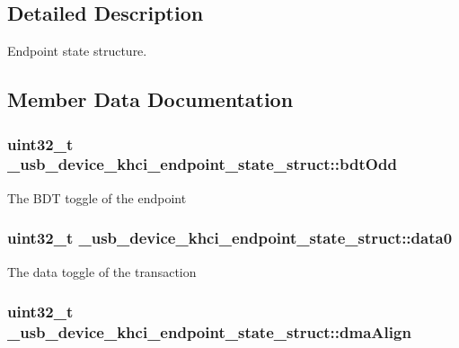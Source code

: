 \subsection{Detailed Description}
Endpoint state structure. 

\subsection{Member Data Documentation}
\hypertarget{struct__usb__device__khci__endpoint__state__struct_a3b5b3ac12e175bf0f4b8a8cc90e1b940}{
\subsubsection[{bdt\-Odd}]{\setlength{\rightskip}{0pt plus 5cm}uint32\-\_\-t \-\_\-usb\-\_\-device\-\_\-khci\-\_\-endpoint\-\_\-state\-\_\-struct\-::bdt\-Odd}}\label{struct__usb__device__khci__endpoint__state__struct_a3b5b3ac12e175bf0f4b8a8cc90e1b940}
The B\-D\-T toggle of the endpoint \hypertarget{struct__usb__device__khci__endpoint__state__struct_a9a85c9cd4a8e3098175dfe388b9525dc}{
\subsubsection[{data0}]{\setlength{\rightskip}{0pt plus 5cm}uint32\-\_\-t \-\_\-usb\-\_\-device\-\_\-khci\-\_\-endpoint\-\_\-state\-\_\-struct\-::data0}}\label{struct__usb__device__khci__endpoint__state__struct_a9a85c9cd4a8e3098175dfe388b9525dc}
The data toggle of the transaction \hypertarget{struct__usb__device__khci__endpoint__state__struct_a13dda1c5564abaf1cbd523f10b5b99ef}{
\subsubsection[{dma\-Align}]{\setlength{\rightskip}{0pt plus 5cm}uint32\-\_\-t \-\_\-usb\-\_\-device\-\_\-khci\-\_\-endpoint\-\_\-state\-\_\-struct\-::dma\-Align}}\label{struct__usb__device__khci__endpoint__state__struct_a13dda1c5564abaf1cbd523f10b5b99ef}
